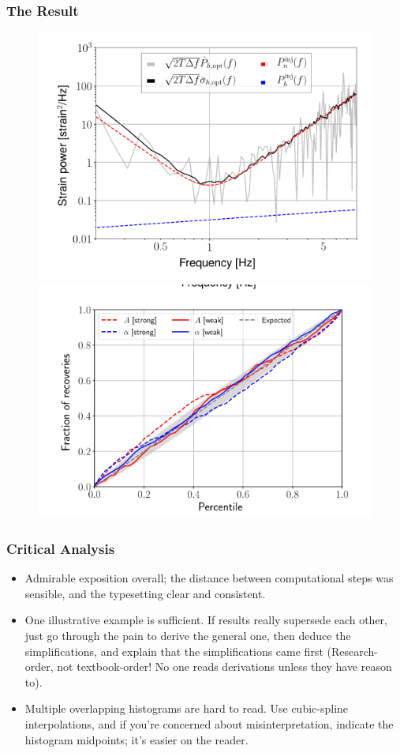 \documentclass[10pt]{beamer}
\begin{document}
\begin{frame}
  \frametitle{The Result}
  \begin{figure}
    \centering
    \includegraphics[scale=.3]{fig5top.png}
    \includegraphics[scale=.3]{fig5bot.png}
  \end{figure}
\end{frame}

\begin{frame}
  \frametitle{Critical Analysis}
  \begin{itemize}
  \item Admirable exposition overall; the distance between computational steps was sensible, and the typesetting clear and consistent.
  \item One illustrative example is sufficient.
    If results really supersede each other, just go through the pain to derive the general one, then deduce the simplifications,
    and explain that the simplifications came first (Research-order, not textbook-order! No one reads derivations unless they have reason to).
  \item Multiple overlapping histograms are hard to read.
    Use cubic-spline interpolations, and if you're concerned about misinterpretation, indicate the histogram midpoints; it's easier on the reader.
  \end{itemize}
\end{frame}
\end{document}
